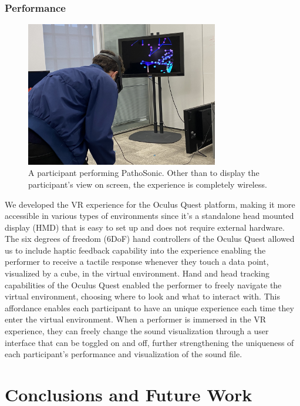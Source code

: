 \documentclass{nime-alternate}
\begin{document}
\subsubsection{Performance}

\begin{figure}[htbp]
       \centering
              \includegraphics[width=0.75\textwidth]{IMG_4563}
       \caption{A participant performing PathoSonic. Other than to display the participant's view on screen, the experience is completely wireless.}
       \label{fig:IMG_4563}
\end{figure}

We developed the VR experience for the Oculus Quest platform, making it more accessible in various types of environments since it’s a standalone head mounted display (HMD) that is easy to set up and does not require external hardware. The six degrees of freedom (6DoF) hand controllers of the Oculus Quest allowed us to include haptic feedback capability into the experience enabling the performer to receive a  tactile response whenever they touch a data point, visualized by a cube, in the virtual environment. Hand and head tracking capabilities of the Oculus Quest enabled the performer to freely navigate the virtual environment, choosing where to look and what to interact with. This affordance enables each participant to have an unique experience each time they enter the virtual environment. When a performer is immersed in the VR experience, they can freely change the sound visualization through a user interface that can be toggled on and off, further strengthening the uniqueness of each participant's performance and visualization of the sound file. 

\section{Conclusions and Future Work}
\end{document}
